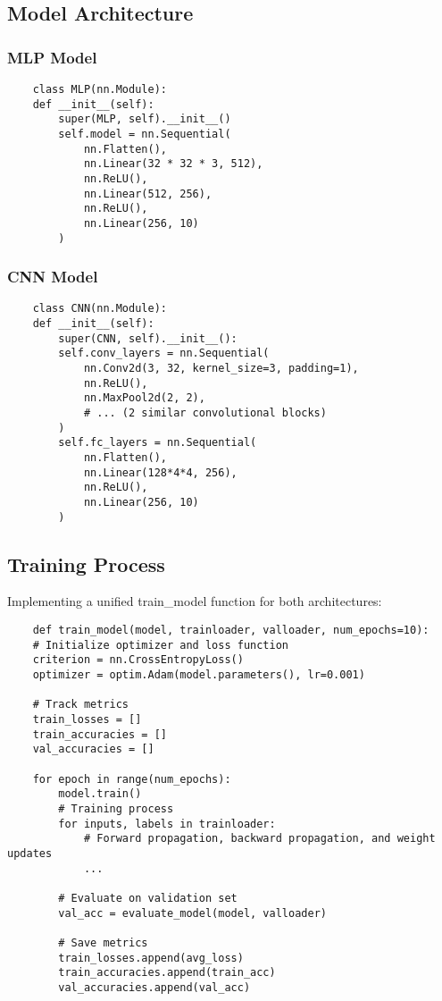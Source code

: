 \documentclass[12pt]{article}
\begin{document}
\subsection{Model Architecture}

\subsubsection{MLP Model}

\begin{verbatim}
    class MLP(nn.Module):
    def __init__(self):
        super(MLP, self).__init__()
        self.model = nn.Sequential(
            nn.Flatten(),
            nn.Linear(32 * 32 * 3, 512),
            nn.ReLU(),
            nn.Linear(512, 256),
            nn.ReLU(),
            nn.Linear(256, 10)
        )
\end{verbatim}

\subsubsection{CNN Model}

\begin{verbatim}
    class CNN(nn.Module):
    def __init__(self):
        super(CNN, self).__init__():
        self.conv_layers = nn.Sequential(
            nn.Conv2d(3, 32, kernel_size=3, padding=1),
            nn.ReLU(),
            nn.MaxPool2d(2, 2),
            # ... (2 similar convolutional blocks)
        )
        self.fc_layers = nn.Sequential(
            nn.Flatten(),
            nn.Linear(128*4*4, 256),
            nn.ReLU(),
            nn.Linear(256, 10)
        )
\end{verbatim}

\subsection{Training Process}

Implementing a unified train\_model function for both architectures:

\begin{verbatim}
    def train_model(model, trainloader, valloader, num_epochs=10):
    # Initialize optimizer and loss function
    criterion = nn.CrossEntropyLoss()
    optimizer = optim.Adam(model.parameters(), lr=0.001)
    
    # Track metrics
    train_losses = []
    train_accuracies = []
    val_accuracies = []
    
    for epoch in range(num_epochs):
        model.train()
        # Training process
        for inputs, labels in trainloader:
            # Forward propagation, backward propagation, and weight updates
            ...
        
        # Evaluate on validation set
        val_acc = evaluate_model(model, valloader)
        
        # Save metrics
        train_losses.append(avg_loss)
        train_accuracies.append(train_acc)
        val_accuracies.append(val_acc)
\end{verbatim}
\end{document}
